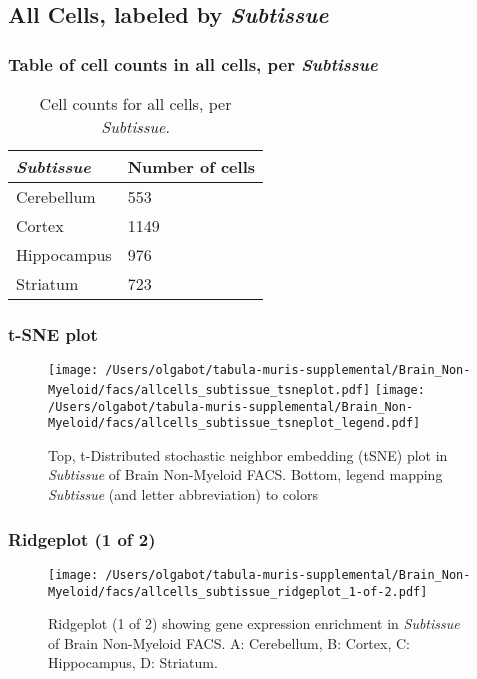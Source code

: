 \clearpage

\subsection{All Cells, labeled by \emph{Subtissue}}
\subsubsection{Table of cell counts in all cells, per \emph{Subtissue}}\begin{table}[h]
\centering
\label{my-label}
\begin{tabular}{@{}ll@{}}
\toprule

\emph{Subtissue}& Number of cells \\ \midrule
Cerebellum & 553 \\

Cortex & 1149 \\

Hippocampus & 976 \\

Striatum & 723 \\
\bottomrule
\end{tabular}
\caption{Cell counts for all cells, per \emph{Subtissue}.}
\end{table}

\clearpage
\subsubsection{t-SNE plot}
\begin{figure}[h]
\centering
\texttt{[image: /Users/olgabot/tabula-muris-supplemental/Brain\_Non-Myeloid/facs/allcells\_subtissue\_tsneplot.pdf]}
\texttt{[image: /Users/olgabot/tabula-muris-supplemental/Brain\_Non-Myeloid/facs/allcells\_subtissue\_tsneplot\_legend.pdf]}
\caption{Top, t-Distributed stochastic neighbor embedding (tSNE) plot  in \emph{Subtissue} of Brain Non-Myeloid FACS. Bottom, legend mapping \emph{Subtissue} (and letter abbreviation) to colors}
\end{figure}


\clearpage

\subsubsection{Ridgeplot (1 of 2)}
\begin{figure}[h]
\centering
\texttt{[image: /Users/olgabot/tabula-muris-supplemental/Brain\_Non-Myeloid/facs/allcells\_subtissue\_ridgeplot\_1-of-2.pdf]}

\caption{ Ridgeplot (1 of 2)  showing gene expression enrichment in \emph{Subtissue} of Brain Non-Myeloid FACS. A: Cerebellum, B: Cortex, C: Hippocampus, D: Striatum.}
\end{figure}


